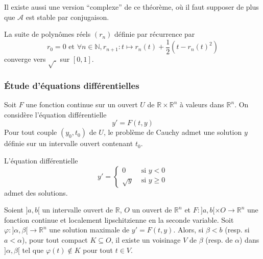 	\begin{remark}
		Il existe aussi une version ``complexe'' de ce théorème, où il faut supposer de plus que $\mathcal{A}$ est stable par conjugaison.
	\end{remark}

	\begin{example}
		La suite de polynômes réels $(r_n)$ définie par récurrence par
		\[ r_0 = 0 \text{ et } \forall n \in \mathbb{N}, r_{n+1} : t \mapsto r_n(t) + \frac{1}{2} (t - r_n(t)^2) \]
		converge vers $\sqrt{.}$ sur $[0,1]$.
	\end{example}

	\subsubsection{Étude d'équations différentielles}


	\begin{theorem}
		Soit $F$ une fonction continue sur un ouvert $U$ de $\mathbb{R} \times \mathbb{R}^n$ à valeurs dans $\mathbb{R}^n$. On considère l'équation différentielle
		\[ y' = F(t,y) \]
		Pour tout couple $(y_0, t_0)$ de $U$, le problème de Cauchy admet une solution $y$ définie sur un intervalle ouvert contenant $t_0$.
	\end{theorem}

	\begin{example}
		L'équation différentielle
		\[
		y' =
		\begin{cases}
			0 &\text{ si } y < 0 \\
			\sqrt{y} &\text{ si } y \geq 0
		\end{cases}
		\]
		admet des solutions.
	\end{example}


	\begin{theorem}
		Soient $]a,b[$ un intervalle ouvert de $\mathbb{R}$, $O$ un ouvert de $\mathbb{R}^n$ et $F : ]a,b[ \times O \rightarrow \mathbb{R}^n$ une fonction continue et localement lipschitzienne en la seconde variable. Soit $\varphi : ]\alpha,\beta[ \rightarrow \mathbb{R}^n$ une solution maximale de $y' = F(t,y)$.
		\newpar
		Alors, si $\beta < b$ (resp. si $a < \alpha$), pour tout compact $K \subseteq O$, il existe un voisinage $V$ de $\beta$ (resp. de $\alpha$) dans $]\alpha,\beta[$ tel que $\varphi(t) \notin K$ pour tout $t \in V$.
	\end{theorem}

